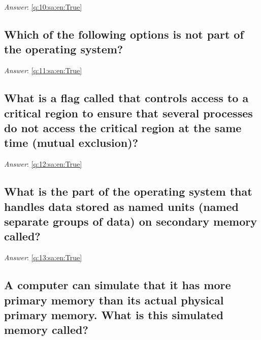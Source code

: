 \documentclass[a4paper,11pt,oneside]{article}
\begin{document}
\begin{sloppypar}
\textit{Answer}: \autoref{q:10:sa:en:True}



\subsection{Which of the following options is not part of the operating system?}

\label{q:11:sa:en:False}

\vspace{2cm}

\noindent\makebox[\textwidth]{\hrulefill}

\vspace{1cm}

\textit{Answer}: \autoref{q:11:sa:en:True}



\subsection{What is a flag called that controls access to a critical region to ensure that several processes do not access the critical region at the same time (mutual exclusion)?}

\label{q:12:sa:en:False}

\vspace{2cm}

\noindent\makebox[\textwidth]{\hrulefill}

\vspace{1cm}

\textit{Answer}: \autoref{q:12:sa:en:True}



\subsection{What is the part of the operating system that handles data stored as named units (named separate groups of data) on secondary memory called?}

\label{q:13:sa:en:False}

\vspace{2cm}

\noindent\makebox[\textwidth]{\hrulefill}

\vspace{1cm}

\textit{Answer}: \autoref{q:13:sa:en:True}



\subsection{A computer can simulate that it has more primary memory than its actual physical primary memory. What is this simulated memory called?}


\end{sloppypar}
\end{document}
